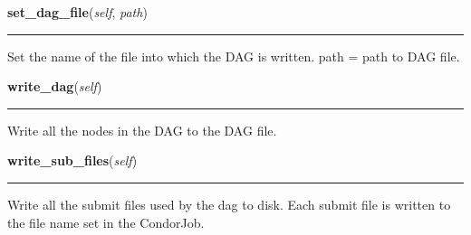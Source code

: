     \label{pipeline:CondorDAG:set_dag_file}
    \vspace{0.5ex}

    \noindent\begin{boxedminipage}{\textwidth}

    \raggedright \textbf{set\_dag\_file}(\textit{self}, \textit{path})

    \vspace{-1.5ex}

    \rule{\textwidth}{0.5\fboxrule}
    Set the name of the file into which the DAG is written. path = path 
    to DAG file.

    \vspace{1ex}

    \end{boxedminipage}

    \label{pipeline:CondorDAG:write_dag}
    \vspace{0.5ex}

    \noindent\begin{boxedminipage}{\textwidth}

    \raggedright \textbf{write\_dag}(\textit{self})

    \vspace{-1.5ex}

    \rule{\textwidth}{0.5\fboxrule}
    Write all the nodes in the DAG to the DAG file.

    \vspace{1ex}

    \end{boxedminipage}

    \label{pipeline:CondorDAG:write_sub_files}
    \vspace{0.5ex}

    \noindent\begin{boxedminipage}{\textwidth}

    \raggedright \textbf{write\_sub\_files}(\textit{self})

    \vspace{-1.5ex}

    \rule{\textwidth}{0.5\fboxrule}
    Write all the submit files used by the dag to disk. Each submit file 
    is written to the file name set in the CondorJob.

    \vspace{1ex}

    \end{boxedminipage}

